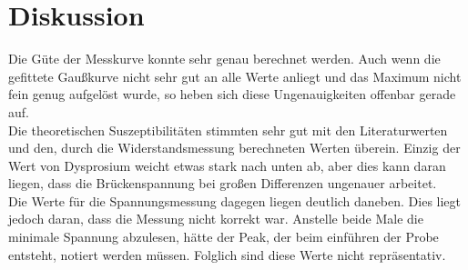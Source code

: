 \section{Diskussion}
Die Güte der Messkurve konnte sehr genau berechnet werden. Auch wenn die gefittete Gaußkurve nicht sehr gut an alle Werte anliegt und das Maximum nicht fein genug aufgelöst wurde, so heben sich diese Ungenauigkeiten offenbar gerade auf.\\
Die theoretischen Suszeptibilitäten stimmten sehr gut mit den Literaturwerten und den, durch die Widerstandsmessung berechneten Werten überein. Einzig der Wert von Dysprosium weicht etwas stark nach unten ab, aber dies kann daran liegen, dass die Brückenspannung bei großen Differenzen ungenauer arbeitet.\\
Die Werte für die Spannungsmessung dagegen liegen deutlich daneben. Dies liegt jedoch daran, dass die Messung nicht korrekt war. Anstelle beide Male die minimale Spannung abzulesen, hätte der Peak, der beim einführen der Probe entsteht, notiert werden müssen. Folglich sind diese Werte nicht repräsentativ.





